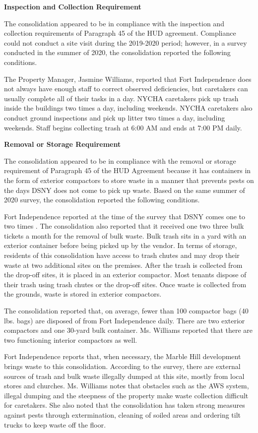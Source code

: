 

\textbf{Inspection and Collection Requirement}

The consolidation appeared to be in compliance with the inspection and collection requirements of Paragraph 45 of the HUD agreement. Compliance could not conduct a site visit during the 2019-2020 period; however, in a survey conducted in the summer of 2020, the consolidation reported the following conditions.

The Property Manager, Jasmine Williams, reported that Fort Independence does not always have enough staff to correct observed deficiencies, but caretakers can usually complete all of their tasks in a day. NYCHA caretakers pick up trash inside the buildings two times a day, including weekends. NYCHA caretakers also conduct ground inspections and pick up litter two times a day, including weekends. Staff begins collecting trash at 6:00 AM and ends at 7:00 PM daily.

\textbf{Removal or Storage Requirement}

The consolidation appeared to be in compliance with the  removal or storage requirement of Paragraph  45 of the HUD Agreement because it has containers in the form of exterior compactors to store waste in a manner that prevents pests on the days DSNY does not come to pick up waste. Based on the same summer of  2020 survey, the consolidation reported the following conditions.

Fort Independence reported at the time of the survey that DSNY comes one to two times . The consolidation also reported that it received one two three bulk tickets a month for the removal of bulk waste. Bulk trash sits in a yard with an exterior container before being picked up by the vendor. In terms of storage, residents of this consolidation have access to trash chutes and may drop their waste at two additional sites on the premises. After the trash is collected from the drop-off sites, it is placed in an exterior compactor. Most tenants dispose of their trash using trash chutes or the drop-off sites. Once waste is collected from the grounds, waste is stored in exterior compactors. 

The consolidation reported that, on average, fewer than 100 compactor bags (40 lbs. bags) are disposed of from Fort Independence daily. There are two exterior compactors and one 30-yard bulk container. Ms. Williams reported that there are two functioning interior compactors as well.

Fort Independence reports that, when necessary, the Marble Hill development brings waste to this consolidation. According to the survey, there are external sources of trash and bulk waste illegally dumped at this site, mostly from local stores and churches. Ms. Williams notes that obstacles such as the AWS system, illegal dumping and the steepness of the property make waste collection difficult for caretakers. She also noted that the consolidation has taken strong measures against pests through extermination, cleaning of soiled areas and ordering tilt trucks to keep waste off the floor.